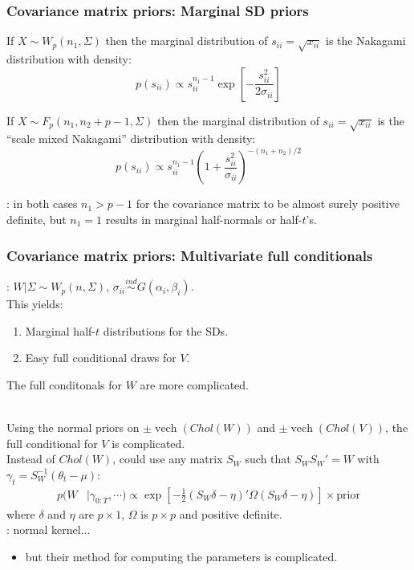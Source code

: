 \documentclass[xcolor=dvipsnames]{beamer}
\DeclareMathOperator{\vech}{vech}
\begin{document}
\begin{frame}
\frametitle{Covariance matrix priors: Marginal SD priors}
If $X\sim W_p(n_1,\Sigma)$ then the marginal distribution of $s_{ii}=\sqrt{x_{ii}}$ is the Nakagami distribution with density:
\[
p(s_{ii})\propto s_{ii}^{n_1-1}\exp\left[-\frac{s_{ii}^2}{2\sigma_{ii}}\right]
\]

\pause If $X\sim F_p(n_1, n_2 + p - 1, \Sigma)$ then the marginal distribution of $s_{ii}=\sqrt{x_{ii}}$ is the ``scale mixed Nakagami'' distribution with density:
\[
p(s_{ii})\propto s_{ii}^{n_1 - 1}\left(1 + \frac{s_{ii}^2}{\sigma_{ii}}\right)^{-(n_1 + n_2)/2}
\]

\pause {\color{blue}{\it The degrees of freedom problem}}: in both cases $n_1 > p - 1$ for the covariance matrix to be almost surely positive definite, but $n_1=1$ results in marginal half-normals or half-$t$'s.
\end{frame}

\begin{frame}
\frametitle{Covariance matrix priors: Multivariate full conditionals}
\citet{huang2013simple}: $W|\Sigma\sim W_p(n,\Sigma)$, $\sigma_{ii}\stackrel{ind}{\sim} G(\alpha_i,\beta_i)$. \\
This yields:
\begin{enumerate}
\item Marginal half-$t$ distributions for the SDs.
\item Easy full conditional draws for $V$.\\
\end{enumerate}
\pause The full conditonals for $W$ are more complicated. \\~

\pause Using the normal priors on $\pm\vech(Chol(W))$ and $\pm\vech(Chol(V))$, the full conditional for $V$ is complicated.\\

\pause Instead of $Chol(W)$, could use any matrix $S_W$ such that $S_WS_W'=W$ with $\gamma_t=S_W^{-1}(\theta_t - \mu)$:
\begin{align*}
  p(W&|\gamma_{0:T},\cdots)\propto \exp\left[-\frac{1}{2}(S_W\delta - \eta)'\Omega(S_W\delta - \eta)\right]\times \mbox{prior}
\end{align*}
where  $\delta$ and $\eta$ are $p\times 1$, $\Omega$ is $p\times p$  and positive definite.\\
\cite{fruhwirth2008bayesian}: normal kernel...
\begin{itemize}
\item[] but their method for computing the parameters is complicated.
\end{itemize}
\end{frame}
\end{document}
